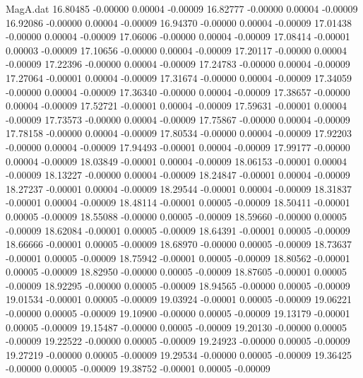 \begin{filecontents}{MagA.dat}
  16.80485   -0.00000    0.00004   -0.00009
  16.82777   -0.00000    0.00004   -0.00009
  16.92086   -0.00000    0.00004   -0.00009
  16.94370   -0.00000    0.00004   -0.00009
  17.01438   -0.00000    0.00004   -0.00009
  17.06006   -0.00000    0.00004   -0.00009
  17.08414   -0.00001    0.00003   -0.00009
  17.10656   -0.00000    0.00004   -0.00009
  17.20117   -0.00000    0.00004   -0.00009
  17.22396   -0.00000    0.00004   -0.00009
  17.24783   -0.00000    0.00004   -0.00009
  17.27064   -0.00001    0.00004   -0.00009
  17.31674   -0.00000    0.00004   -0.00009
  17.34059   -0.00000    0.00004   -0.00009
  17.36340   -0.00000    0.00004   -0.00009
  17.38657   -0.00000    0.00004   -0.00009
  17.52721   -0.00001    0.00004   -0.00009
  17.59631   -0.00001    0.00004   -0.00009
  17.73573   -0.00000    0.00004   -0.00009
  17.75867   -0.00000    0.00004   -0.00009
  17.78158   -0.00000    0.00004   -0.00009
  17.80534   -0.00000    0.00004   -0.00009
  17.92203   -0.00000    0.00004   -0.00009
  17.94493   -0.00001    0.00004   -0.00009
  17.99177   -0.00000    0.00004   -0.00009
  18.03849   -0.00001    0.00004   -0.00009
  18.06153   -0.00001    0.00004   -0.00009
  18.13227   -0.00000    0.00004   -0.00009
  18.24847   -0.00001    0.00004   -0.00009
  18.27237   -0.00001    0.00004   -0.00009
  18.29544   -0.00001    0.00004   -0.00009
  18.31837   -0.00001    0.00004   -0.00009
  18.48114   -0.00001    0.00005   -0.00009
  18.50411   -0.00001    0.00005   -0.00009
  18.55088   -0.00000    0.00005   -0.00009
  18.59660   -0.00000    0.00005   -0.00009
  18.62084   -0.00001    0.00005   -0.00009
  18.64391   -0.00001    0.00005   -0.00009
  18.66666   -0.00001    0.00005   -0.00009
  18.68970   -0.00000    0.00005   -0.00009
  18.73637   -0.00001    0.00005   -0.00009
  18.75942   -0.00001    0.00005   -0.00009
  18.80562   -0.00001    0.00005   -0.00009
  18.82950   -0.00000    0.00005   -0.00009
  18.87605   -0.00001    0.00005   -0.00009
  18.92295   -0.00000    0.00005   -0.00009
  18.94565   -0.00000    0.00005   -0.00009
  19.01534   -0.00001    0.00005   -0.00009
  19.03924   -0.00001    0.00005   -0.00009
  19.06221   -0.00000    0.00005   -0.00009
  19.10900   -0.00000    0.00005   -0.00009
  19.13179   -0.00001    0.00005   -0.00009
  19.15487   -0.00000    0.00005   -0.00009
  19.20130   -0.00000    0.00005   -0.00009
  19.22522   -0.00000    0.00005   -0.00009
  19.24923   -0.00000    0.00005   -0.00009
  19.27219   -0.00000    0.00005   -0.00009
  19.29534   -0.00000    0.00005   -0.00009
  19.36425   -0.00000    0.00005   -0.00009
  19.38752   -0.00001    0.00005   -0.00009

\end{filecontents}
